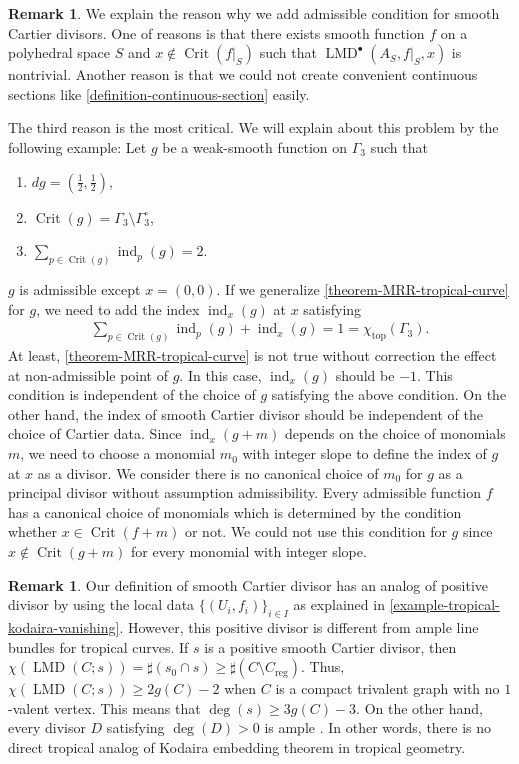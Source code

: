 \documentclass[a4paper,dvipdfmx,reqno,12pt]{amsart}
\theoremstyle{definition}
\newtheorem{remark}[theorem]{Remark}
\newcommand{\opn}[1]{\operatorname{#1}}
\numberwithin{equation}{section}
\begin{document}
\begin{remark}
\label{remark-non-admissible-divisor}
We explain the reason why we add admissible condition for 
smooth Cartier divisors. 
One of reasons is that there exists smooth function $f$
on a polyhedral space $S$ and 
$x\notin\opn{Crit}(f|_S)$ such that
$\opn{LMD}^{\bullet}(A_S,f|_{S},x)$ is nontrivial.
Another reason is that we could not create 
convenient continuous sections like 
\cref{definition-continuous-section} easily.

The third reason is the most critical. 
We will explain about this problem by the following 
example:
Let 
$g$ be a weak-smooth function on 
$\Gamma_3$
such that 
\begin{enumerate}
\item $dg=(\frac{1}{2},\frac{1}{2})$,
\item $\opn{Crit}(g)=\Gamma_3\setminus \Gamma_3^{\circ}$,
\item $\sum_{p\in \opn{Crit}(g)}\opn{ind}_p(g)=2$.
\end{enumerate}
$g$ is admissible except $x=(0,0)$.
If we generalize 
\cref{theorem-MRR-tropical-curve} for $g$, 
we need to add the index $\opn{ind}_x(g)$ at $x$ satisfying
\begin{align}
\sum_{p\in \opn{Crit}(g)}\opn{ind}_p(g)+
\opn{ind}_x(g)=1=\chi_{\opn{top}}(\Gamma_3).
\end{align}
At least, \cref{theorem-MRR-tropical-curve} is not
true without correction the effect at non-admissible point
of $g$.
In this case, $\opn{ind}_x(g)$ should be $-1$.
This condition is independent of the choice
of $g$ satisfying the above condition.
On the other hand, the index of smooth Cartier
divisor should be independent of the choice of
Cartier data.
Since $\opn{ind}_x(g+m)$ depends on the choice
of monomials $m$, we need to choose a monomial $m_0$
with integer slope to 
define the index of $g$ at $x$ as a divisor.
We consider there is no canonical choice
of $m_0$ for $g$ as a principal divisor without
assumption admissibility.
Every admissible function $f$ has a canonical choice
of monomials which is determined by the condition 
whether $x\in \opn{Crit}(f+m)$ or not.
We could not use this condition for $g$ since 
$x\notin \opn{Crit}(g+m)$ for every monomial with
integer slope.
\end{remark}

\begin{remark}
Our definition of smooth Cartier divisor 
has an analog of positive divisor by using 
the local data $\{(U_i,f_i)\}_{i\in I}$ as 
explained in \cref{example-tropical-kodaira-vanishing}.
However, this positive divisor is different 
from ample line bundles for tropical curves. 
If $s$ is a positive smooth Cartier divisor, then
$\chi(\opn{LMD}(C;s))=\sharp(s_0\cap s)\geq \sharp 
(C\setminus C_{\opn{reg}})$. 
Thus, $\chi(\opn{LMD}(C;s))\geq 2g(C)-2$
when $C$ is a compact trivalent
graph with no $1$-valent vertex. This means that
$\opn{deg}(s)\geq 3g(C)-3$.
On the other hand, every divisor $D$ satisfying
$\opn{deg}(D)>0$ is ample \cite[Corollary 43]{MR2892941}.
In other words, there is no direct tropical
analog of Kodaira embedding theorem
in tropical geometry.
\end{remark}
\end{document}
